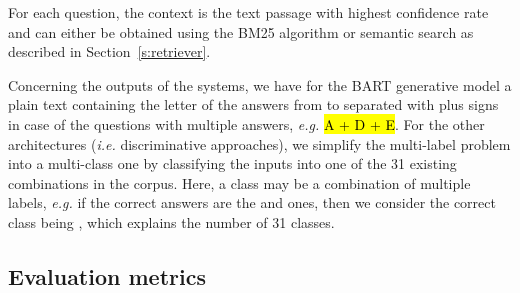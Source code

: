 \documentclass[11pt]{article}
\begin{document}
For each question, the context is the text passage with highest confidence rate and can either be obtained using the BM25 algorithm or semantic search as described in Section~\ref{s:retriever}.



Concerning the outputs of the systems, we have for the BART generative model a plain text containing the letter of the answers from  to  separated with plus signs in case of the questions with multiple answers, {\it e.g.} \hl{A + D + E}. For the other architectures ({\it i.e.} discriminative approaches), we simplify the multi-label problem into a multi-class one by classifying the inputs into one of the 31 existing combinations in the corpus. Here, a class may be a combination of multiple labels, {\it e.g.} if the correct answers are the  and  ones, then we consider the correct class being , which explains the number of 31 classes.

\begin{table*}[htb!]
\caption{\label{table:ResultsTableHammingScore}Performance (in \%) on the test set using the Hamming score and EMR metrics.}
\end{table*}

\subsection{Evaluation metrics}
\end{document}
